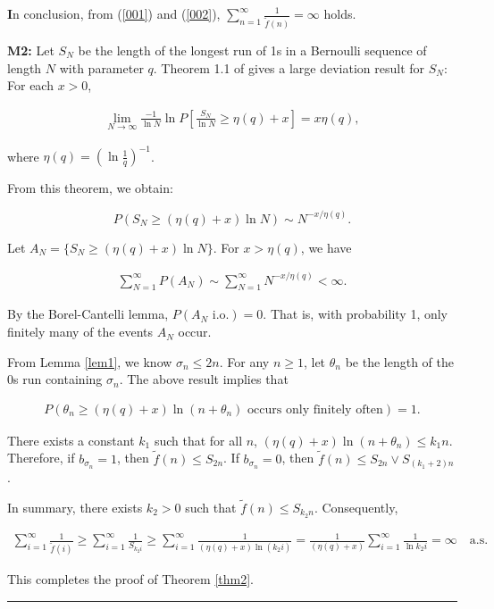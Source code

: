 \documentclass[10pt,twoside]{article}
\renewenvironment{proof}[1]{\noindent\textbf{#1}}{\ \rule{0.5em}{0.5em}}
\begin{document}
\begin{proof}
In conclusion, from (\ref{001}) and (\ref{002}), $\sum_{n=1}^{\infty} \frac{1}{\tilde{f}(n)} = \infty$ holds.

\textbf{M2:} Let $S_N$ be the length of the longest run of 1s in a Bernoulli sequence of length $N$ with parameter $q$. Theorem 1.1 of \cite{MWW2015} gives a large deviation result for $S_N$: For each $x > 0$, \quad
 

\begin{eqnarray}  
 \lim_{N \to \infty} \frac{-1}{\ln N} \ln P\left[ \frac{S_N}{\ln N} \geq \eta(q) + x \right] = x \eta(q),
\end{eqnarray}
 
where $\eta(q) = (\ln \frac{1}{q})^{-1}$.

From this theorem, we obtain:
 

$$
P(S_N \geq (\eta(q) + x) \ln N) \sim N^{-x / \eta(q)}.
$$

 
Let $A_N = \{S_N \geq (\eta(q) + x) \ln N\}$. For $x > \eta(q)$, we have
 

\begin{eqnarray}
\sum_{N=1}^{\infty} P(A_N) \sim \sum_{N=1}^{\infty} N^{-x / \eta(q)} < \infty.
  \end{eqnarray}
 
By the Borel-Cantelli lemma, $P(A_N \text{ i.o.}) = 0$. That is, with probability 1, only finitely many of the events $A_N$ occur.

From Lemma \ref{lem1}, we know $\sigma_n \leq 2n$. For any $n \geq 1$, let $\theta_n$ be the length of the $0$s run containing $\sigma_n$. The above result implies that
 

\begin{eqnarray} 
P(\theta_n \geq (\eta(q) + x) \ln(n + \theta_n) \text{ occurs only finitely often}) = 1.
 \end{eqnarray}

 
There exists a constant $k_1$ such that for all $n$, $(\eta(q) + x) \ln(n + \theta_n) \leq k_1 n$. Therefore, if $b_{\sigma_n} = 1$, then $\tilde{f}(n) \leq S_{2n}$.
If $b_{\sigma_n} = 0$, then $\tilde{f}(n) \leq S_{2n} \vee S_{(k_1+2)n}$.

In summary, there exists $k_2 > 0$ such that $\tilde{f}(n) \leq S_{k_2 n}$. Consequently,
 

\begin{eqnarray} 
\sum_{i=1}^{\infty} \frac{1}{\tilde{f}(i)} \geq \sum_{i=1}^{\infty} \frac{1}{S_{k_2 i}} \geq \sum_{i=1}^{\infty} \frac{1}{(\eta(q)+x) \ln (k_2 i)} = \frac{1}{(\eta(q)+x)} \sum_{i=1}^{\infty} \frac{1}{\ln k_2i} = \infty \quad \text{a.s.}
\end{eqnarray}

 
This completes the proof of Theorem \ref{thm2}.
\end{proof}
\end{document}
